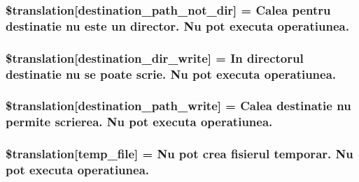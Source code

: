 \subsubsection[{\$translation}]{\setlength{\rightskip}{0pt plus 5cm}\$translation\mbox{[}\textquotesingle{}destination\+\_\+path\+\_\+not\+\_\+dir\textquotesingle{}\mbox{]} = \textquotesingle{}Calea pentru destinatie nu este un director. Nu pot executa operatiunea.\textquotesingle{}}\label{class_8upload_8ro___r_o_8php_a5704a67137126e8c87b7a364175929d4}
\hypertarget{class_8upload_8ro___r_o_8php_a97608ea194a616db49141a0e6dee900c}{}
\subsubsection[{\$translation}]{\setlength{\rightskip}{0pt plus 5cm}\$translation\mbox{[}\textquotesingle{}destination\+\_\+dir\+\_\+write\textquotesingle{}\mbox{]} = \textquotesingle{}In directorul destinatie nu se poate scrie. Nu pot executa operatiunea.\textquotesingle{}}\label{class_8upload_8ro___r_o_8php_a97608ea194a616db49141a0e6dee900c}
\hypertarget{class_8upload_8ro___r_o_8php_a40e4e1962226b89fd76da5819a9602b0}{}
\subsubsection[{\$translation}]{\setlength{\rightskip}{0pt plus 5cm}\$translation\mbox{[}\textquotesingle{}destination\+\_\+path\+\_\+write\textquotesingle{}\mbox{]} = \textquotesingle{}Calea destinatie nu permite scrierea. Nu pot executa operatiunea.\textquotesingle{}}\label{class_8upload_8ro___r_o_8php_a40e4e1962226b89fd76da5819a9602b0}
\hypertarget{class_8upload_8ro___r_o_8php_a2baece8da11e20d45175db91851ec3e3}{}
\subsubsection[{\$translation}]{\setlength{\rightskip}{0pt plus 5cm}\$translation\mbox{[}\textquotesingle{}temp\+\_\+file\textquotesingle{}\mbox{]} = \textquotesingle{}Nu pot crea fisierul temporar. Nu pot executa operatiunea.\textquotesingle{}}\label{class_8upload_8ro___r_o_8php_a2baece8da11e20d45175db91851ec3e3}
\hypertarget{class_8upload_8ro___r_o_8php_a922967ca2df0efdd455261142d8e5715}{}

